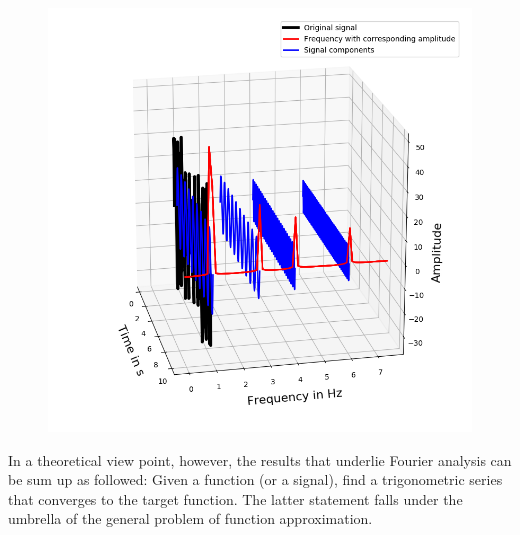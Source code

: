 \documentclass[../Main/thesis.tex]{subfiles}
\begin{document}
\begin{figure}[H] %
   \centering
   \includegraphics[width=6in]{../fig/fft_domain} 
   \caption{}
   \label{fig:fft_domain}
\end{figure}
\justify
In a theoretical view point, however, the results that underlie Fourier analysis can be sum up as followed: Given a function (or a signal), find a trigonometric series that converges to the target function. The latter statement falls under the umbrella of the general problem of function approximation.  
\end{document}
